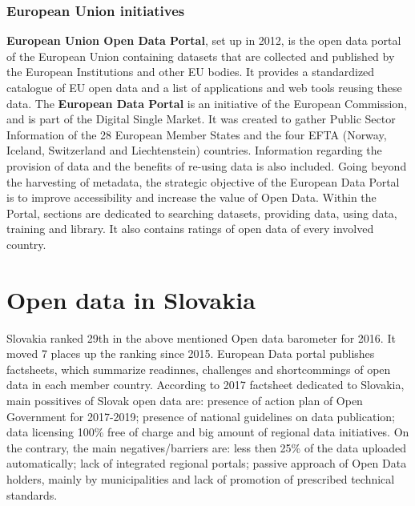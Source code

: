 \documentclass[thesis=B,english]{FITthesis}[2012/06/26]
\begin{document}
	\subsection{European Union initiatives}
\textbf{European Union Open Data Portal}, set up in 2012, is the open data portal of the European Union containing datasets that are collected and published by the European Institutions and other EU bodies. It provides a standardized catalogue of EU open data and a list of applications and web tools reusing these data. \cite{EUopendataportal}
\hspace{10000px}
The \textbf{European Data Portal} is an initiative of the European Commission, and is part of the Digital Single Market. It was created to gather Public Sector Information of the 28 European Member States and the four EFTA (Norway, Iceland, Switzerland and Liechtenstein) countries. Information regarding the provision of data and the benefits of re-using data is also included. Going beyond the harvesting of metadata, the strategic objective of the European Data Portal is to improve accessibility and increase the value of Open Data. Within the Portal, sections are dedicated to searching datasets, providing data, using data, training and library. It also contains ratings of open data of every involved country. \cite{eudataportal}

\chapter{Open data in Slovakia}
	Slovakia ranked 29th in the above mentioned Open data barometer for 2016. It moved 7 places up the ranking since 2015. European Data portal publishes factsheets, which summarize readinnes, challenges and shortcommings of open data in each member country. According to 2017 factsheet dedicated to Slovakia, main possitives of Slovak open data are: presence of action plan of Open Government for 2017-2019; presence of national guidelines on data publication; data licensing 100\% free of charge and big amount of regional data initiatives. On the contrary, the main negatives/barriers are: less then 25\% of the data uploaded automatically; lack of integrated regional portals; passive approach of Open Data holders, mainly by municipalities and lack of promotion of prescribed technical standards. \cite{eudataportalfactsheet}
\end{document}
